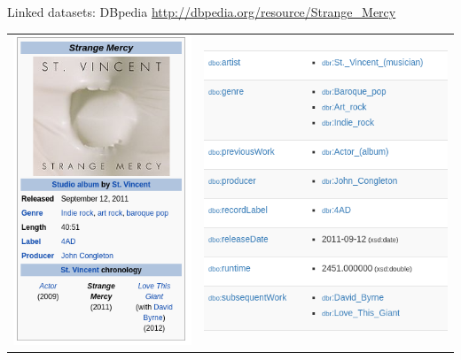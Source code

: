 \documentclass{beamer}
\begin{document}
\begin{frame}{Linked datasets: DBpedia}
\url{http://dbpedia.org/resource/Strange_Mercy}
\vspace{.5cm}

\begin{tabular}{l|l}
\includegraphics[width=.32\textwidth]{strange_mercy1.png}
&
\includegraphics[width=.5\textwidth]{dbpedia1.png}
\end{tabular}
\end{frame}
\end{document}

